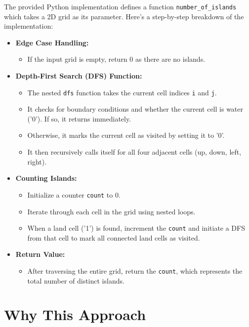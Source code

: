 The provided Python implementation defines a function \texttt{number\_of\_islands} which takes a 2D grid as its parameter. Here's a step-by-step breakdown of the implementation:
    
\begin{itemize}
    \item \textbf{Edge Case Handling:}
    \begin{itemize}
        \item If the input grid is empty, return 0 as there are no islands.
    \end{itemize}
    
    \item \textbf{Depth-First Search (DFS) Function:}
    \begin{itemize}
        \item The nested \texttt{dfs} function takes the current cell indices \texttt{i} and \texttt{j}.
        \item It checks for boundary conditions and whether the current cell is water ('0'). If so, it returns immediately.
        \item Otherwise, it marks the current cell as visited by setting it to '0'.
        \item It then recursively calls itself for all four adjacent cells (up, down, left, right).
    \end{itemize}
    
    \item \textbf{Counting Islands:}
    \begin{itemize}
        \item Initialize a counter \texttt{count} to 0.
        \item Iterate through each cell in the grid using nested loops.
        \item When a land cell ('1') is found, increment the \texttt{count} and initiate a DFS from that cell to mark all connected land cells as visited.
    \end{itemize}
    
    \item \textbf{Return Value:}
    \begin{itemize}
        \item After traversing the entire grid, return the \texttt{count}, which represents the total number of distinct islands.
    \end{itemize}
\end{itemize}
    
\section*{Why This Approach}
    
